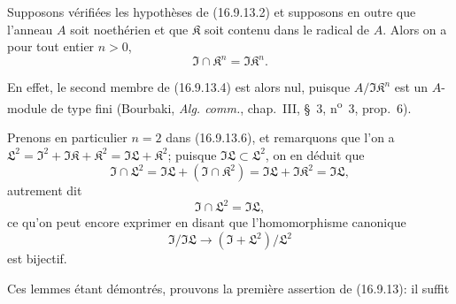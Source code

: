 \begin{corollary}[16.9.13.5]
\label{IV.16.9.13.5}
Supposons vérifiées les hypothèses de (16.9.13.2) et supposons en outre que
l'anneau $A$ soit noethérien et que $\mathfrak{K}$ soit contenu dans le
radical de $A$. Alors on a pour tout entier $n>0$,
\[
  \mathfrak{I}\cap\mathfrak{K}^n=\mathfrak{I}\mathfrak{K}^n.
  \tag{16.9.13.6}
  \label{IV.16.9.13.6}
\]
\end{corollary}

En effet, le second membre de (16.9.13.4) est alors nul, puisque
$A/\mathfrak{I}\mathfrak{K}^n$ est un $A$-module de type fini (Bourbaki,
\emph{Alg. comm.}, chap.~III, §~3, n\textsuperscript{o}~3, prop.~6).

Prenons en particulier $n=2$ dans (16.9.13.6), et remarquons que l'on a
$\mathfrak{L}^2=\mathfrak{I}^2+\mathfrak{I}\mathfrak{K}+\mathfrak{K}^2
=\mathfrak{I}\mathfrak{L}+\mathfrak{K}^2$; puisque
$\mathfrak{I}\mathfrak{L}\subset\mathfrak{L}^2$, on en déduit que
\[
  \mathfrak{I}\cap\mathfrak{L}^2
  =\mathfrak{I}\mathfrak{L}+(\mathfrak{I}\cap\mathfrak{K}^2)
  =\mathfrak{I}\mathfrak{L}+\mathfrak{I}\mathfrak{K}^2
  =\mathfrak{I}\mathfrak{L},
\]
autrement dit
\[
  \mathfrak{I}\cap\mathfrak{L}^2=\mathfrak{I}\mathfrak{L},
  \tag{16.9.13.7}
  \label{IV.16.9.13.7}
\]
ce qu'on peut encore exprimer en disant que l'homomorphisme canonique
\[
  \mathfrak{I}/\mathfrak{I}\mathfrak{L}
  \longrightarrow(\mathfrak{I}+\mathfrak{L}^2)/\mathfrak{L}^2
\]
est bijectif.

Ces lemmes étant démontrés, prouvons la première assertion de (16.9.13): il
suffit
